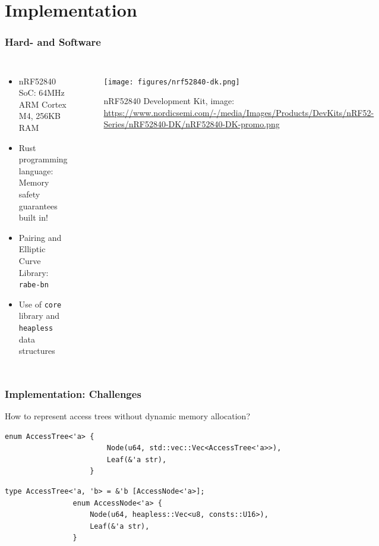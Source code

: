 \section{Implementation}

\begin{frame}
    \frametitle{Hard- and Software}
    \begin{columns}[c]
        \begin{itemize}
            \item nRF52840 SoC: \textcolor{TUMBlau}{64MHz} ARM Cortex M4, \textcolor{TUMBlau}{256KB RAM}
            \item Rust programming language: Memory safety guarantees built in!
            \item Pairing and Elliptic Curve Library: \texttt{rabe-bn}\footnotemark
            \item Use of \texttt{core} library and \texttt{heapless} data structures\footnotemark
        \end{itemize}
        
        \begin{figure}
            \texttt{[image: figures/nrf52840-dk.png]}
            \caption{nRF52840 Development Kit, image: \url{https://www.nordicsemi.com/-/media/Images/Products/DevKits/nRF52-Series/nRF52840-DK/nRF52840-DK-promo.png}}
        \end{figure}
    \end{columns}
\end{frame}

\begin{frame}[c, fragile]
    \frametitle{Implementation: Challenges}
    \begin{block}{How to represent access trees without dynamic memory allocation?}
        \begin{center}
            \begin{minipage}{0.7\textwidth}
                \begin{lstlisting}[caption={Naive implementation (uses standard library)}]
                    enum AccessTree<'a> {
                        Node(u64, std::vec::Vec<AccessTree<'a>>),
                        Leaf(&'a str),
                    }
                \end{lstlisting}
            \begin{lstlisting}[caption={Refined implementation}]
                type AccessTree<'a, 'b> = &'b [AccessNode<'a>];
                enum AccessNode<'a> {
                    Node(u64, heapless::Vec<u8, consts::U16>),
                    Leaf(&'a str),
                }
                \end{lstlisting}
            \end{minipage}
        \end{center}
    \end{block}
\end{frame}

